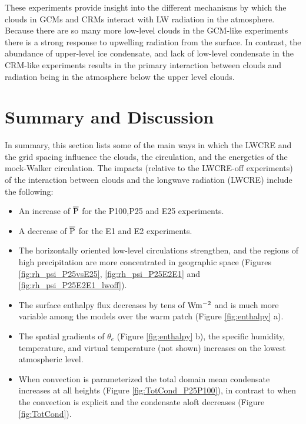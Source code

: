 \documentclass[draft]{agujournal2019}
\begin{document}
{These experiments provide insight into the different mechanisms by which the clouds in GCMs and CRMs
interact with LW radiation in the atmosphere.  Because there are so many more low-level clouds in 
the GCM-like experiments there is a strong response to upwelling radiation from the surface.  In contrast, 
the abundance of upper-level ice condensate, and lack of low-level condensate in the CRM-like experiments 
results in the primary interaction between clouds and radiation being in the atmosphere below the upper level clouds.       

 

\section{Summary and Discussion} 
In summary, this section lists some of the main ways in which the LWCRE and the grid spacing influence
the clouds, the circulation, and the energetics of the mock-Walker circulation.   
The impacts (relative to the LWCRE-off experiments) of the interaction between clouds and the longwave radiation 
(LWCRE) include the following: 

\begin{itemize}
  \item An increase of $\overline{\rm{P}}$  for the P100,P25 and E25 experiments.
  \item A decrease of $\overline{\rm{P}}$  for the E1 and E2 experiments.
  \item The horizontally oriented low-level circulations strengthen, and the regions of high precipitation are more concentrated  
  in geographic space (Figures \ref{fig:rh_psi_P25vsE25}, \ref{fig:rh_psi_P25E2E1} and \ref{fig:rh_psi_P25E2E1_lwoff}).  
  \item The surface enthalpy flux decreases by tens of $\rm{W m^{-2}}$ and is much more variable among the models over the warm patch (Figure \ref{fig:enthalpy} a).
  \item The spatial gradients of $\theta_e$ (Figure \ref{fig:enthalpy} b), the specific humidity, temperature, and virtual temperature 
  (not shown) increases on the lowest atmospheric level.  
  \item When convection is parameterized the total domain mean condensate increases at all heights 
  (Figure \ref{fig:TotCond_P25P100}), in contrast to when the convection is explicit and 
  the condensate aloft decreases (Figure \ref{fig:TotCond}).    
\end{itemize}

}
\end{document}
